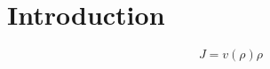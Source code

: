 \section{\label{introduction}Introduction}

\begin{equation}
\label{ec-flow}
J = v(\rho)\rho
\end{equation}